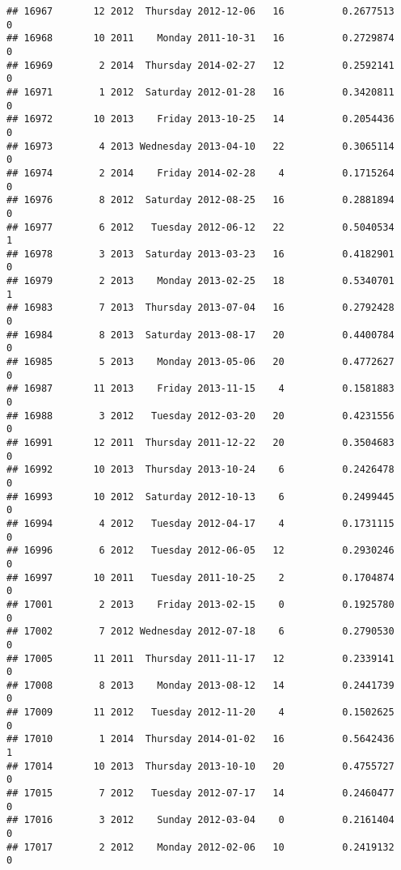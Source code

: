 \documentclass[
]{article}
\begin{document}
\begin{verbatim}
## 16967       12 2012  Thursday 2012-12-06   16          0.2677513             0
## 16968       10 2011    Monday 2011-10-31   16          0.2729874             0
## 16969        2 2014  Thursday 2014-02-27   12          0.2592141             0
## 16971        1 2012  Saturday 2012-01-28   16          0.3420811             0
## 16972       10 2013    Friday 2013-10-25   14          0.2054436             0
## 16973        4 2013 Wednesday 2013-04-10   22          0.3065114             0
## 16974        2 2014    Friday 2014-02-28    4          0.1715264             0
## 16976        8 2012  Saturday 2012-08-25   16          0.2881894             0
## 16977        6 2012   Tuesday 2012-06-12   22          0.5040534             1
## 16978        3 2013  Saturday 2013-03-23   16          0.4182901             0
## 16979        2 2013    Monday 2013-02-25   18          0.5340701             1
## 16983        7 2013  Thursday 2013-07-04   16          0.2792428             0
## 16984        8 2013  Saturday 2013-08-17   20          0.4400784             0
## 16985        5 2013    Monday 2013-05-06   20          0.4772627             0
## 16987       11 2013    Friday 2013-11-15    4          0.1581883             0
## 16988        3 2012   Tuesday 2012-03-20   20          0.4231556             0
## 16991       12 2011  Thursday 2011-12-22   20          0.3504683             0
## 16992       10 2013  Thursday 2013-10-24    6          0.2426478             0
## 16993       10 2012  Saturday 2012-10-13    6          0.2499445             0
## 16994        4 2012   Tuesday 2012-04-17    4          0.1731115             0
## 16996        6 2012   Tuesday 2012-06-05   12          0.2930246             0
## 16997       10 2011   Tuesday 2011-10-25    2          0.1704874             0
## 17001        2 2013    Friday 2013-02-15    0          0.1925780             0
## 17002        7 2012 Wednesday 2012-07-18    6          0.2790530             0
## 17005       11 2011  Thursday 2011-11-17   12          0.2339141             0
## 17008        8 2013    Monday 2013-08-12   14          0.2441739             0
## 17009       11 2012   Tuesday 2012-11-20    4          0.1502625             0
## 17010        1 2014  Thursday 2014-01-02   16          0.5642436             1
## 17014       10 2013  Thursday 2013-10-10   20          0.4755727             0
## 17015        7 2012   Tuesday 2012-07-17   14          0.2460477             0
## 17016        3 2012    Sunday 2012-03-04    0          0.2161404             0
## 17017        2 2012    Monday 2012-02-06   10          0.2419132             0

\end{verbatim}
\end{document}
